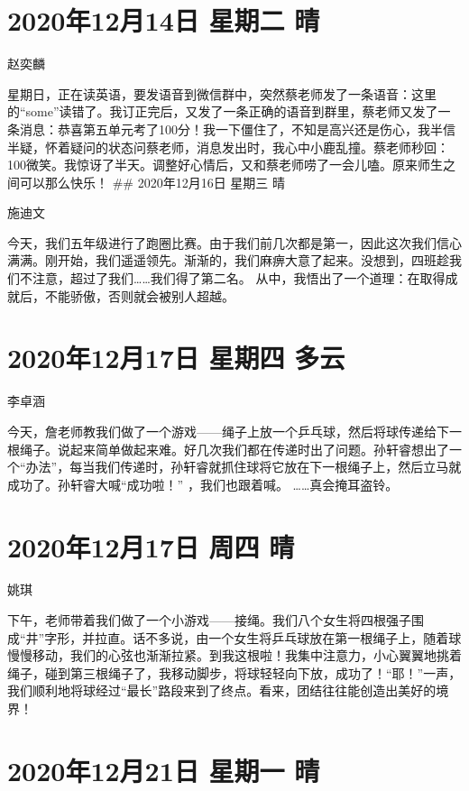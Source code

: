 \section{2020年12月14日 星期二 晴}

赵奕麟

星期日，正在读英语，要发语音到微信群中，突然蔡老师发了一条语音：这里的``some''读错了。我订正完后，又发了一条正确的语音到群里，蔡老师又发了一条消息：恭喜第五单元考了100分！我一下僵住了，不知是高兴还是伤心，我半信半疑，怀着疑问的状态问蔡老师，消息发出时，我心中小鹿乱撞。蔡老师秒回：100微笑。我惊讶了半天。调整好心情后，又和蔡老师唠了一会儿嗑。原来师生之间可以那么快乐！
\#\# 2020年12月16日 星期三 晴

施迪文

今天，我们五年级进行了跑圈比赛。由于我们前几次都是第一，因此这次我们信心满满。刚开始，我们遥遥领先。渐渐的，我们麻痹大意了起来。没想到，四班趁我们不注意，超过了我们\ldots\ldots 我们得了第二名。
从中，我悟出了一个道理：在取得成就后，不能骄傲，否则就会被别人超越。

\section{2020年12月17日 星期四 多云}

李卓涵

今天，詹老师教我们做了一个游戏------绳子上放一个乒乓球，然后将球传递给下一根绳子。说起来简单做起来难。好几次我们都在传递时出了问题。孙轩睿想出了一个``办法''，每当我们传递时，孙轩睿就抓住球将它放在下一根绳子上，然后立马就成功了。孙轩睿大喊``成功啦！''
，我们也跟着喊。 \ldots\ldots 真会掩耳盗铃。

\section{2020年12月17日 周四 晴}

姚琪

下午，老师带着我们做了一个小游戏------接绳。我们八个女生将四根强子围成``井''字形，并拉直。话不多说，由一个女生将乒乓球放在第一根绳子上，随着球慢慢移动，我们的心弦也渐渐拉紧。到我这根啦！我集中注意力，小心翼翼地挑着绳子，碰到第三根绳子了，我移动脚步，将球轻轻向下放，成功了！``耶！''一声，我们顺利地将球经过``最长''路段来到了终点。看来，团结往往能创造出美好的境界！

\section{2020年12月21日 星期一 晴}


